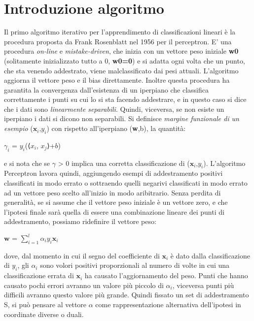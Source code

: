 \documentclass{article}
\begin{document}
	\section{Introduzione algoritmo}
	Il primo algoritmo iterativo per l'apprendimento di classificazioni lineari è la procedura proposta da Frank Rosenblatt nel 1956 per il perceptron. E' una procedura \textit{on-line} e \textit{mistake-driven},
	che inizia con un vettore peso iniziale \textbf{w0} (solitamente inizializzato tutto a 0, \textbf{w0=0}) e si adatta ogni volta che un punto, che sta venendo addestrato, viene malclassificato dai pesi attuali.
	L'algoritmo aggiorna il vettore peso e il bias direttamente. Inoltre questa procedura ha garantita la convergenza dall'esistenza di un iperpiano che classifica correttamente i punti su cui lo si sta facendo addestrare, e in questo
	caso si dice che i dati sono \textit{linearmente separabili}. Quindi, viceversa, se non esiste un iperpiano i dati si dicono non separabili. Si definisce \textit{margine funzionale di un esempio} ({$\textbf{x}_i$},$y_i$) con rispetto all'iperpiano (\textbf{w},b), la quantità:
	\begin{center}
		$\gamma_i$ = $y_i$(⟨$x_i$, $x_j$⟩+$b$) 
	\end{center}
	e si nota che se $\gamma$ > 0 implica una corretta classificazione di ({$\textbf{x}_i$},$y_i$).
	L'algoritmo Perceptron lavora quindi, aggiungendo esempi di addestramento positivi classificati in modo errato o sottraendo quelli negarivi classificati in modo errato ad un vettore peso scelto all'inizio in modo aribitrario.
	Senza perdita di generalità, se si assume che il vettore peso iniziale è un vettore zero, e che l'ipotesi finale sarà quella di essere una combinazione lineare dei punti di addestramento, possiamo ridefinire il vettore peso: 
	\begin{center}
		$\textbf{w}$ = $\displaystyle\sum_{i=1}^l \alpha_iy_i\textbf{x}_i$
	\end{center}
	dove, dal momento in cui il segno del coefficiente di $\textbf{x}_i$ è dato dalla classificazione di $y_i$, gli $\alpha_i$ sono volori positivi proporzionali al numero di volte in cui una classificazione errata di $\textbf{x}_i$ ha causato l'aggiornamento del peso.
	Punti che hanno causato pochi errori avranno un valore più piccolo di $\alpha_i$, viceversa punti più difficili avranno questo valore più grande.
	Quindi fissato un set di addestramento S, si può pensare al vettore \textbf{$\alpha$} come rappresentazione alternativa dell'ipotesi in coordinate diverse o duali.
\end{document}
